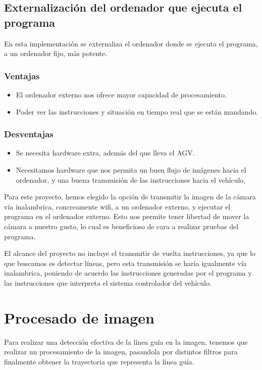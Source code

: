 \subsection{Externalización del ordenador que ejecuta el programa} 

En esta implementación se externaliza el ordenador donde se ejecuta el programa, a un ordenador fijo, más potente.
\subsubsection{Ventajas}
\begin{itemize}
	\item El ordenador externo nos ofrece mayor capacidad de procesamiento.
	
	\item Poder ver las instrucciones y situación en tiempo real que se están mandando.
	
\end{itemize}

\subsubsection{Desventajas}
\begin{itemize}
	\item Se necesita hardware extra, además del que lleva el AGV.
	
	\item Necesitamos hardware que nos permita un buen flujo de imágenes hacia el ordenador, y una buena transmisión de las instrucciones hacia el vehículo.
	
\end{itemize} 

Para este proyecto, hemos elegido la opción de transmitir la imagen de la cámara vía inalambrica, concreamente wifi, a un ordenador externo, y ejecutar el programa en el ordenador externo. Esto nos permite tener libertad de mover la cámara a nuestro gusto, lo cual es beneficioso de cara a realizar pruebas del programa.

El alcance del proyecto no incluye el transmitir de vuelta instrucciones, ya que lo que buscamos es detectar líneas, pero esta transmisión se haría igualmente vía inalambrica, poniendo de acuerdo las instrucciones generadas por el programa y las instrucciones que interpreta el sistema controlador del vehículo.

\section{Procesado de imagen}
Para realizar una detección efectiva de la línea guía en la imagen, tenemos que realizar un procesamiento de la imagen, pasandola por distintos filtros para finalmente obtener la trayectoria que representa la línea guía.

